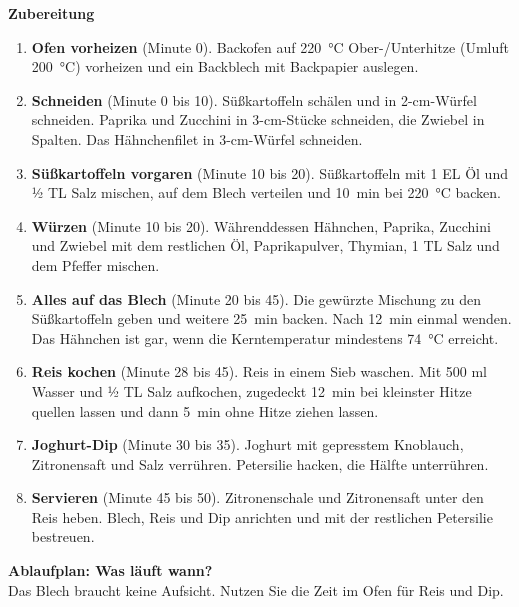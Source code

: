 \documentclass[11pt,a4paper]{article}
\begin{document}
\begin{minipage}[t]{0.58\linewidth}\vspace{0pt}
{\sffamily\Large\bfseries\color{tomate} Zubereitung}
\begin{enumerate}[leftmargin=2.0em, itemsep=0.45em, label=\textcolor{tomate}{\sffamily\bfseries\arabic*}, labelsep=0.6em]
  \item \textbf{Ofen vorheizen} (Minute 0). Backofen auf \qty{220}{\celsius} Ober-/Unterhitze (Umluft \qty{200}{\celsius})
        vorheizen und ein Backblech mit Backpapier auslegen.
  \item \textbf{Schneiden} (Minute 0 bis 10). Süßkartoffeln schälen und in 2-cm-Würfel schneiden. Paprika und Zucchini
        in 3-cm-Stücke schneiden, die Zwiebel in Spalten. Das Hähnchenfilet in 3-cm-Würfel schneiden.
  \item \textbf{Süßkartoffeln vorgaren} (Minute 10 bis 20). Süßkartoffeln mit 1 EL Öl und ½ TL Salz mischen, auf dem
        Blech verteilen und \qty{10}{min} bei \qty{220}{\celsius} backen.
  \item \textbf{Würzen} (Minute 10 bis 20). Währenddessen Hähnchen, Paprika, Zucchini und Zwiebel mit dem restlichen Öl,
        Paprikapulver, Thymian, 1 TL Salz und dem Pfeffer mischen.
  \item \textbf{Alles auf das Blech} (Minute 20 bis 45). Die gewürzte Mischung zu den Süßkartoffeln geben und weitere
        \qty{25}{min} backen. Nach \qty{12}{min} einmal wenden. Das Hähnchen ist gar, wenn die Kerntemperatur mindestens
        \qty{74}{\celsius} erreicht.
  \item \textbf{Reis kochen} (Minute 28 bis 45). Reis in einem Sieb waschen. Mit 500 ml Wasser und ½ TL Salz aufkochen,
        zugedeckt \qty{12}{min} bei kleinster Hitze quellen lassen und dann \qty{5}{min} ohne Hitze ziehen lassen.
  \item \textbf{Joghurt-Dip} (Minute 30 bis 35). Joghurt mit gepresstem Knoblauch, Zitronensaft und Salz verrühren.
        Petersilie hacken, die Hälfte unterrühren.
  \item \textbf{Servieren} (Minute 45 bis 50). Zitronenschale und Zitronensaft unter den Reis heben. Blech, Reis und Dip
        anrichten und mit der restlichen Petersilie bestreuen.
\end{enumerate}
\end{minipage}

\newpage
{\sffamily\Large\bfseries\color{tomate} Ablaufplan: Was läuft wann?}\\[0.2em]
{\small Das Blech braucht keine Aufsicht. Nutzen Sie die Zeit im Ofen für Reis und Dip.}
\end{document}
